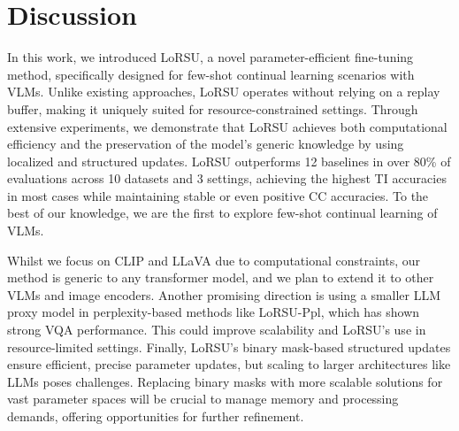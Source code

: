 \section{Discussion}\label{sec:discussion}
In this work, we introduced LoRSU, a novel parameter-efficient fine-tuning method, specifically designed for few-shot continual learning scenarios with VLMs. Unlike existing approaches, LoRSU operates without relying on a replay buffer, making it uniquely suited for resource-constrained settings. Through extensive experiments, we demonstrate that LoRSU achieves both computational efficiency and the preservation of the model’s generic knowledge by using localized and structured updates. LoRSU outperforms 12 baselines in over 80\% of evaluations across 10 datasets and 3 settings, achieving the highest TI accuracies in most cases while maintaining stable or even positive CC accuracies. To the best of our knowledge, we are the first to explore few-shot continual learning of VLMs.

Whilst we focus on CLIP and LLaVA due to computational constraints, our method is generic to any transformer model, and we plan to extend it to other VLMs and image encoders. Another promising direction is using a smaller LLM proxy model in perplexity-based methods like LoRSU-Ppl, which has shown strong VQA performance. This could improve scalability and LoRSU's use in resource-limited settings. Finally, LoRSU’s binary mask-based structured updates ensure efficient, precise parameter updates, but scaling to larger architectures like LLMs poses challenges. Replacing binary masks with more scalable solutions for vast parameter spaces will be crucial to manage memory and processing demands, offering opportunities for further refinement.
